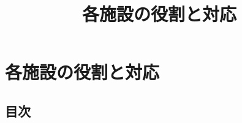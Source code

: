 \documentclass[
  japanese,
  letterpaper,
  DIV=11,
  numbers=noendperiod]{scrartcl}
\title{各施設の役割と対応}
\author{}
\date{}
\renewcommand*\contentsname{目次}
\newcommand\contentsname{目次}
\begin{document}
\maketitle

\renewcommand*\contentsname{目次}
{
\hypersetup{linkcolor=}
\setcounter{tocdepth}{3}
\tableofcontents
}

\section{各施設の役割と対応}\label{ux5404ux65bdux8a2dux306eux5f79ux5272ux3068ux5bfeux5fdc}

\subsection{目次}\label{ux76eeux6b21}
\end{document}
